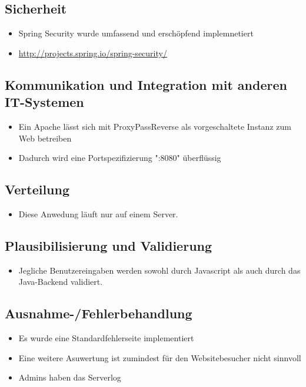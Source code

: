 \documentclass[a4paper]{article}
\begin{document}
\subsection{Sicherheit}

\begin{itemize}
	\item Spring Security wurde umfassend und erschöpfend implemnetiert
	\item \url{http://projects.spring.io/spring-security/}
\end{itemize}

\subsection{Kommunikation und Integration mit anderen IT-Systemen}

\begin{itemize}
	\item Ein Apache lässt sich mit ProxyPassReverse als vorgeschaltete Instanz zum Web betreiben
	\item Dadurch wird eine Portspezifizierung ":8080" überflüssig
\end{itemize}

\subsection{Verteilung}

\begin{itemize}
	\item Diese Anwedung läuft nur auf einem Server.
\end{itemize}

\subsection{Plausibilisierung und Validierung}

\begin{itemize}
	\item Jegliche Benutzereingaben werden sowohl durch Javascript als auch durch das Java-Backend validiert.
\end{itemize}

\subsection{Ausnahme-/Fehlerbehandlung}

\begin{itemize}
	\item Es wurde eine Standardfehlerseite implementiert
	\item Eine weitere Asuwertung ist zumindest für den Websitebesucher nicht sinnvoll
	\item Admins haben das Serverlog
\end{itemize}
\end{document}
